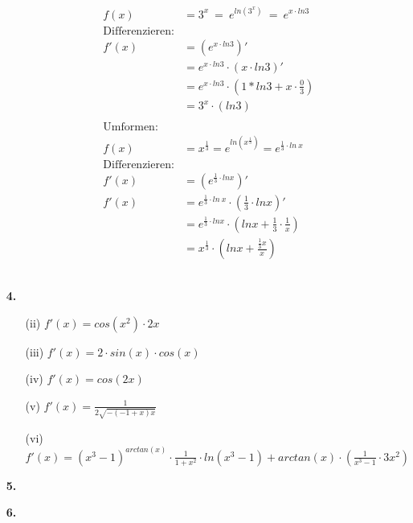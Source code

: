 \documentclass[a4paper,11pt]{article}
\begin{document}
\begin{enumerate}
\begin{enumerate}
\begin{align*}
                            f(x) &= 3^x \ = \ e^{ln(3^x)} \ = \  e^{x \cdot ln3} \\
                            \text{Differenzieren:}& \\
                            f'(x) &= \left(e^{x \cdot ln3} \right)' \\
                            &= e^{x \cdot ln3} \cdot \left(x \cdot ln3 \right)'\\
                            &= e^{x \cdot ln3} \cdot \left( 1* ln3+x \cdot \frac{0}{3}\right) \\ 
                            &= 3^x  \cdot \left(ln3 \right) \\
                            \\
                            \text{Umformen:} & \\
                            f(x) &= x^{\frac{1}{3}} = e^{ln(x^{\frac{1}{3}})} = e^{\frac{1}{3}\cdot ln\ x} \\
                            \text{Differenzieren:}& \\
                            f'(x) &= \left(e^{\frac{1}{3}\cdot lnx}\right)' \\
                            f'(x) &= e^{\frac{1}{3}\cdot ln\ x} \cdot \left(\frac{1}{3}\cdot ln x\right)' \\
                            &= e^{\frac{1}{3}\cdot ln x} \cdot \left( ln x + \frac{1}{3}  \cdot \frac{1}{x} \right) \\
                            &= x^{\frac{1}{3}} \cdot \left(ln x + \frac{\frac{1}{3}x}{x} \right) \\ \\ \\
                        \end{align*}             
            \end{enumerate}

        \item[\textbf{4.}]
            \begin{enumerate}
                \item[(ii)] 
                   $ f'(x)= cos(x^2) \cdot 2x$
                \item[(iii)]
                    $f'(x)= 2 \cdot sin(x) \cdot cos(x)$
                \item[(iv)]
                    $f'(x) = cos(2x)$
                \item[(v)]
                    $f'(x) = \frac{1}{2\sqrt{-(-1+x)x}}$
                \item[(vi)]
                    $ f'(x)= (x^3 - 1)^{arctan(x)} \cdot \frac{1}{1+x^2} \cdot ln(x^3 - 1) + arctan(x) \cdot \left( \frac{1}{x^3-1} \cdot 3x^2 \right) $    
            \end{enumerate}            
        \item[\textbf{5.}]
            \todo
        \item[\textbf{6.}]
            \todo
    \end{enumerate}
\end{document}
